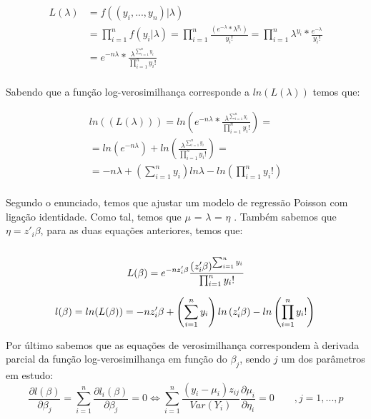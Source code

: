 \documentclass{article}
\begin{document}
				\begin{align*}
					L(\lambda)&= f( (y_{i}, ..., y_{n}) | \lambda) \\					
						  &= \prod_{i=1}^{n} f(y_{i} | \lambda)			
						  = \prod_{i=1}^{n} \frac{ (e^{-\lambda}*\lambda^{y_i})}{y_i!} 				
						  = \prod_{i=1}^{n} \lambda^{y_{i}}*\frac{e^{-\lambda}}{y_{i}!} \\			
						&= e^{-n\lambda}*\frac{\lambda^{\sum_{i=1}^{n} y_{i}}}{\prod_{i=1}^{n} y_{i}!} \\
				\end{align*}		
				
	
				Sabendo que a função log-verosimilhança corresponde a  $ln(L(\lambda))$ temos que:

				\begin{align*}
				ln((L(\lambda)))=ln\left(e^{-n\lambda}*\frac{\lambda^{\sum_{i=1}^{n} y_{i}}} {\prod_{i=1}^{n} y_{i}!}\right)=	\\	
				= ln(e^{-n\lambda})+ln\left(\frac{\lambda^{\sum_{i=1}^{n} y_{i}}} {\prod_{i=1}^{n} y_{i}!}\right)= 		\\		
				= -n\lambda + \left(\sum_{i=1}^{n} y_{i}\right)ln \lambda - ln\left(\prod_{i=1}^{n} y_{i}!\right)\\
				\end{align*}		

				Segundo o enunciado, temos que ajustar um modelo de regressão Poisson com ligação identidade. Como tal, temos que $\mu$ = $\lambda$ = $\eta$ . Também sabemos que $\eta = z'_{i}\beta$, para as duas equações anteriores, temos que:\\ \\
				\begin{equation*}
					L(\beta) = e^{-nz'_{i}\beta}\frac{\left(z'_{i}\beta\right)^{\sum_{i=1}^{n} y_{i}}}{\prod_{i=1}^{n} y_{i}!}\\
				\end{equation*}

				\begin{equation*}
					l(\beta) = ln(L(\beta))= -nz'_{i}\beta + \left(\sum_{i=1}^{n} y_{i}\right)ln \left(z'_{i}\beta\right) - ln\left(\prod_{i=1}^{n} y_{i}!\right)\\
				\end{equation*}

				Por último sabemos que as equações de verosimilhança correspondem à derivada parcial da função log-verosimilhança em função do $\beta_j$, sendo $j$ um dos parâmetros em estudo: 
				\begin{equation*}
					\frac{\partial l(\beta)}{\partial \beta_{j}} = \sum_{i=1}^{n}\frac{\partial l_{i}(\beta)}{\partial \beta_{j}} = 0 \Leftrightarrow \sum_{i=1}^{n}\frac{(y_{i}-\mu_{i})z_{ij}}{Var(Y_{i})}\frac{\partial \mu_{i}}{\partial \eta_{i}} = 0  \quad \quad, j = 1, ..., p
				\end{equation*}
\end{document}
